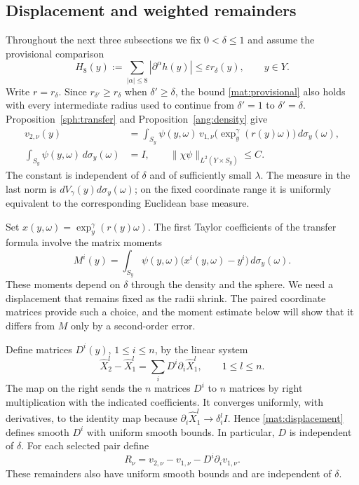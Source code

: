 \subsection{Displacement and weighted remainders}

Throughout the next three subsections we fix $0<\delta\le1$ and assume
the provisional comparison
\begin{equation}
 H_8(y):=\sum_{|\alpha|\le8}|\partial^\alpha h(y)|
                    \le\varepsilon r_\delta(y),\qquad y\in Y.
 \label{mat:provisional}
\end{equation}
Write $r=r_\delta$.  Since $r_{\delta'}\ge r_\delta$ when
$\delta'\ge\delta$, the bound \eqref{mat:provisional} also holds with
every intermediate radius used to continue from $\delta'=1$ to
$\delta'=\delta$.  Proposition~\ref{sph:transfer} and
Proposition~\ref{ang:density} give
\begin{equation}
 \begin{split}
 v_{2,\nu}(y)
    &=\int_{S_y}\psi(y,\omega)\,
          v_{1,\nu}\big(\exp_y^\gamma(r(y)\omega)\big)
          \,d\sigma_y(\omega),\\
 \int_{S_y}\psi(y,\omega)\,d\sigma_y(\omega)&=I,
 \qquad \|\chi\psi\|_{L^2(Y\times S_y)}\le C.
 \end{split}
 \label{mat:transfer-input}
\end{equation}
The constant is independent of $\delta$ and of sufficiently small
$\lambda$.  The measure in the last norm is
$dV_\gamma(y)d\sigma_y(\omega)$; on the fixed coordinate range it is
uniformly equivalent to the corresponding Euclidean base measure.

Set $x(y,\omega)=\exp_y^\gamma(r(y)\omega)$.  The first Taylor
coefficients of the transfer formula involve the matrix moments
\[
 M^i(y)=\int_{S_y}\psi(y,\omega)
                   \big(x^i(y,\omega)-y^i\big)\,d\sigma_y(\omega).
\]
These moments depend on $\delta$ through the density and the sphere.
We need a displacement that remains fixed as the radii shrink.  The
paired coordinate matrices provide such a choice, and the moment
estimate below will show that it differs from $M$ only by a
second-order error.

Define matrices $D^i(y)$, $1\le i\le n$, by the linear system
\begin{equation}
 \widehat X_2^l-\widehat X_1^l
        =\sum_iD^i\partial_i\widehat X_1^l,
                   \qquad 1\le l\le n.
 \label{mat:displacement}
\end{equation}
The map on the right sends the $n$ matrices $D^i$ to $n$ matrices by
right multiplication with the indicated coefficients.  It converges
uniformly, with derivatives, to the identity map because
$\partial_i\widehat X_1^l\to\delta_i^l I$.  Hence
\eqref{mat:displacement} defines smooth $D^i$ with uniform smooth
bounds.  In particular, $D$ is independent of $\delta$.  For each
selected pair define
\begin{equation}
 R_\nu=v_{2,\nu}-v_{1,\nu}-D^i\partial_i v_{1,\nu}.
 \label{mat:remainder}
\end{equation}
These remainders also have uniform smooth bounds and are independent
of $\delta$.

